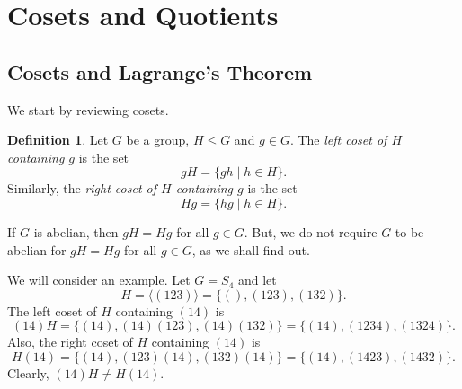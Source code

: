 \documentclass[a4paper, openany]{memoir}
\theoremstyle{definition}
\newtheorem{definition}{Definition}[section]
\theoremstyle{plain}
\begin{document}
\newpage

\section{Cosets and Quotients}
\subsection{Cosets and Lagrange's Theorem}
We start by reviewing cosets.
\begin{definition}
Let $G$ be a group, $H \leqslant G$ and $g \in G$. The \emph{left coset of $H$ containing $g$} is the set
\[gH = \{gh \mid h \in H\}.\]
Similarly, the \emph{right coset of $H$ containing $g$} is the set
\[Hg = \{hg \mid h \in H\}.\]
\end{definition}
\noindent If $G$ is abelian, then $gH = Hg$ for all $g \in G$. But, we do not require $G$ to be abelian for $gH = Hg$ for all $g \in G$, as we shall find out.

We will consider an example. Let $G = S_4$ and let
\[H = \langle (1 2 3) \rangle = \{(), (123), (132)\}.\]
The left coset of $H$ containing $(14)$ is
\[(14) H = \{(14), (14)(123), (14)(132)\} = \{(14), (1234), (1324)\}.\]
Also, the right coset of $H$ containing $(14)$ is
\[H (14) = \{(14), (123)(14), (132)(14)\} = \{(14), (1423), (1432)\}.\]
Clearly, $(14)H \neq H(14)$.
\end{document}
